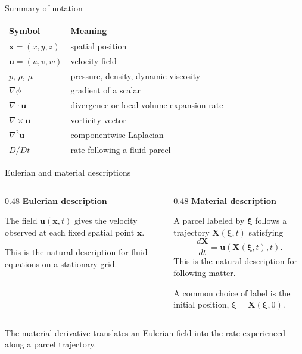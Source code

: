 \documentclass[aspectratio=169,11pt]{beamer}
\newcommand{\uvec}{\bm{u}}
\newcommand{\xvec}{\bm{x}}
\begin{document}
\begin{frame}{Summary of notation}
\begin{center}
\renewcommand{\arraystretch}{1.28}
\begin{tabular}{ll}
\toprule
Symbol & Meaning \\
\midrule
$\xvec=(x,y,z)$ & spatial position \\
$\uvec=(u,v,w)$ & velocity field \\
$p$, $\rho$, $\mu$ & pressure, density, dynamic viscosity \\
$\nabla\phi$ & gradient of a scalar \\
$\nabla\cdot\uvec$ & divergence or local volume-expansion rate \\
$\nabla\times\uvec$ & vorticity vector \\
$\nabla^2\uvec$ & componentwise Laplacian \\
$D/Dt$ & rate following a fluid parcel \\
\bottomrule
\end{tabular}
\end{center}
\end{frame}

\begin{frame}{Eulerian and material descriptions}
\begin{columns}[T,onlytextwidth]
\begin{column}{0.48\textwidth}
\textbf{Eulerian description}

The field $\uvec(\xvec,t)$ gives the velocity observed at each fixed spatial point $\xvec$.

\medskip
This is the natural description for fluid equations on a stationary grid.
\end{column}
\begin{column}{0.48\textwidth}
\textbf{Material description}

A parcel labeled by $\bm{\xi}$ follows a trajectory $\mathbf{X}(\bm{\xi},t)$ satisfying
\[
  \frac{d\mathbf{X}}{dt}
  =\uvec(\mathbf{X}(\bm{\xi},t),t).
\]
This is the natural description for following matter.

\medskip
{\small A common choice of label is the initial position, $\bm{\xi}=\mathbf{X}(\bm{\xi},0)$.}
\end{column}
\end{columns}
\begin{punchbox}
\centering
\small The material derivative translates an Eulerian field into the rate experienced along a parcel trajectory.
\end{punchbox}
\end{frame}
\end{document}

